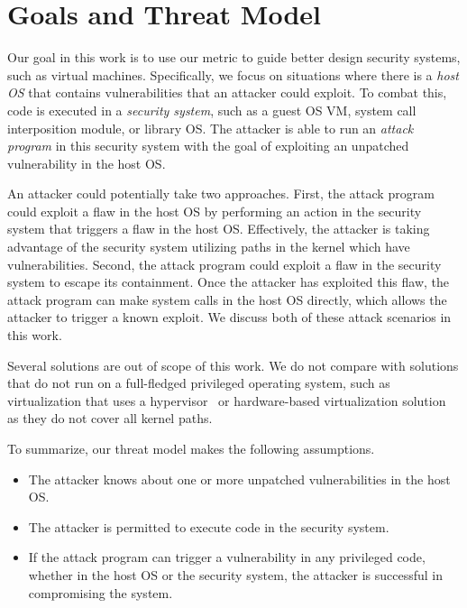 \section{Goals and Threat Model}
\label{sec.motivation-and-background}

Our goal in this work is to use our metric to guide better design
security systems, such as virtual machines. Specifically, we focus on 
situations where there is a \emph{host OS} that contains vulnerabilities
that an attacker could exploit. To combat this, code is executed in a \emph{security system}, such as a guest OS VM, system call interposition module, or library OS. The attacker is able to run an \emph{attack program} in this security system with the goal of exploiting an unpatched vulnerability in the host OS.

An attacker could potentially take two approaches. First, the attack program could exploit a flaw in the host OS by 
performing an action in the security system that triggers a flaw in
the host OS. Effectively, the attacker is taking advantage of the security 
system utilizing paths in the kernel which have vulnerabilities.
Second, the attack program could exploit a flaw in the security system to 
escape its containment. Once the attacker has exploited this flaw, the
attack program can make system calls in the host OS directly, which allows
the attacker to trigger a known exploit. We discuss both of these attack 
scenarios in this work.


Several solutions are out of scope of this
work. We do not compare with solutions that do not run on a full-fledged 
privileged operating system, such as virtualization that uses a 
hypervisor~\cite{Xen-03} or hardware-based virtualization 
solution~\cite{IntelVT} as they do not cover all kernel paths. 

To summarize, our threat model makes the following assumptions.

\begin{itemize}\setlength\itemsep{0em}
\item The attacker knows about one or more unpatched vulnerabilities in the 
host OS.

\item The attacker is permitted to execute code in the security
system.

\item If the attack program can trigger a vulnerability in any privileged code,
whether in the host OS or the security system, the attacker is successful in 
compromising the system.

\end{itemize}

